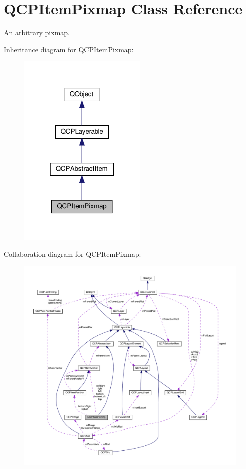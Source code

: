 \hypertarget{classQCPItemPixmap}{}\section{Q\+C\+P\+Item\+Pixmap Class Reference}
\label{classQCPItemPixmap}


An arbitrary pixmap.  




Inheritance diagram for Q\+C\+P\+Item\+Pixmap\+:\nopagebreak
\begin{figure}[H]
\begin{center}
\leavevmode
\includegraphics[width=175pt]{classQCPItemPixmap__inherit__graph}
\end{center}
\end{figure}


Collaboration diagram for Q\+C\+P\+Item\+Pixmap\+:\nopagebreak
\begin{figure}[H]
\begin{center}
\leavevmode
\includegraphics[width=350pt]{classQCPItemPixmap__coll__graph}
\end{center}
\end{figure}
